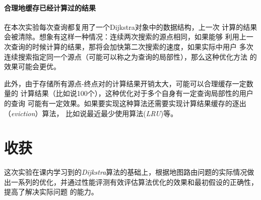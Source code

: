 \documentclass[12pt,a4paper]{ctexart}
\begin{document}
\paragraph{合理地缓存已经计算过的结果}
在本次实验每次查询都复用了一个Dijkstra对象中的数据结构，上一次
计算的结果会被清除。想象有这样一种情况：连续两次搜索的源点相同，如果能够
利用上一次查询的时候计算的结果，那将会加快第二次搜索的速度，如果实际中用户
多次连续搜索指定同一个源点（可能可以称之为查询的局部性），那么这种优化方法
的效果可能会更优。


此外，由于存储所有源点-终点对的计算结果开销太大，可能可以合理缓存一定数量的
计算结果（比如说100个），这种优化对于多个自身有一定查询局部性的用户的查询
可能有一定效果。如果要实现这种算法还需要实现计算结果缓存的逐出（\textit{eviction}）算法，
比如说最近最少使用算法(\textit{LRU})等。

\section{收获}
这次实验在课内学习到的\textit{Dijkstra}算法的基础上，根据地图路由问题的实际情况做出一系列的优化，并通过性能评测有效评估算法优化的效果和最初假设的正确性，提高了解决实际问题
的能力。
\end{document}
